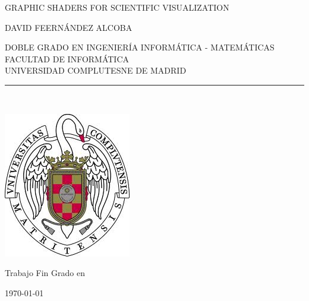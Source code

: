 \begin{center}

   \vspace{1cm}


   {\Large GRAPHIC SHADERS FOR SCIENTIFIC VISUALIZATION}\\

   \vspace{0.5cm}

   \vspace{0.5cm}

   {\large DAVID FEERNÁNDEZ ALCOBA}\\

   \vspace{0.5cm}

   DOBLE GRADO EN INGENIERÍA INFORMÁTICA - MATEMÁTICAS\\ 
   FACULTAD DE INFORMÁTICA\\
   UNIVERSIDAD COMPLUTESNE DE MADRID \\


   \vspace{0.65cm}
   \rule{2in}{0.5pt}\\
   \vspace{1.85cm}

  \includegraphics[height=2.5in]{figures/escudo.jpg}
  

   \vspace{1.5cm}
Trabajo Fin Grado en  

   \vspace{0.5cm}


  \today\\
   \vspace{1cm}

\end{center}

